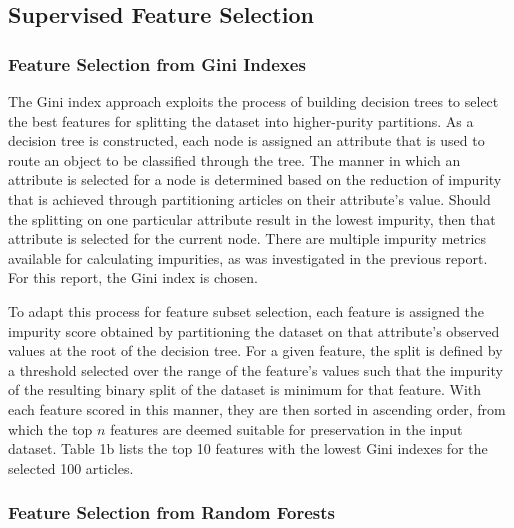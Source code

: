 \documentclass[11pt]{article}
\begin{document}
\subsection{Supervised Feature Selection}


\subsubsection{Feature Selection from Gini Indexes}

The Gini index approach exploits the process of building decision trees to select the best features for splitting the dataset into higher-purity partitions.
As a decision tree is constructed, each node is assigned an attribute that is used to route an object to be classified through the tree.
The manner in which an attribute is selected for a node is determined based on the reduction of impurity that is achieved through partitioning articles on their attribute's value.
Should the splitting on one particular attribute result in the lowest impurity, then that attribute is selected for the current node.
There are multiple impurity metrics available for calculating impurities, as was investigated in the previous report.
For this report, the Gini index is chosen.

To adapt this process for feature subset selection, each feature is assigned the impurity score obtained by partitioning the dataset on that attribute's observed values at the root of the decision tree.
For a given feature, the split is defined by a threshold selected over the range of the feature's values such that the impurity of the resulting binary split of the dataset is minimum for that feature.
With each feature scored in this manner, they are then sorted in ascending order, from which the top $n$ features are deemed suitable for preservation in the input dataset.
Table 1b lists the top 10 features with the lowest Gini indexes for the selected 100 articles.

\subsubsection{Feature Selection from Random Forests}
\end{document}
